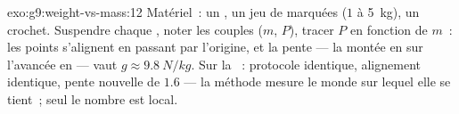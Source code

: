 \begin{solution}{exo:g9:weight-vs-mass:12}
Matériel~: un , un jeu de  marquées ($1$ à
\qty{5}{kg}), un crochet. Suspendre chaque , noter les couples
($m$, $P$), tracer $P$ en fonction de $m$~: les points s'alignent en
passant par l'origine, et la pente --- la montée en  sur
l'avancée en  --- vaut $g \approx \qty{9.8}{N/kg}$. Sur la
~: protocole identique, alignement identique, pente nouvelle de
$1.6$ --- la méthode mesure le monde sur lequel elle se tient~; seul
le nombre est local.
\end{solution}

